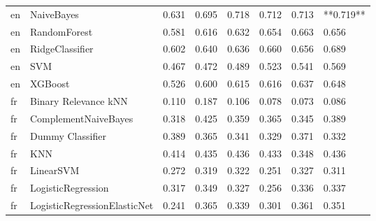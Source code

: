 \begin{tabular}{llllllll}
      en &                      NaiveBayes & 0.631 &                     0.695 &                 0.718 &                  0.712 &                                   0.713 & **0.719** \\
      en &                    RandomForest & 0.581 &                     0.616 &                 0.632 &                  0.654 &                                   0.663 &     0.656 \\
      en &                 RidgeClassifier & 0.602 &                     0.640 &                 0.636 &                  0.660 &                                   0.656 &     0.689 \\
      en &                             SVM & 0.467 &                     0.472 &                 0.489 &                  0.523 &                                   0.541 &     0.569 \\
      en &                         XGBoost & 0.526 &                     0.600 &                 0.615 &                  0.616 &                                   0.637 &     0.648 \\
      fr &            Binary Relevance kNN & 0.110 &                     0.187 &                 0.106 &                  0.078 &                                   0.073 &     0.086 \\
      fr &            ComplementNaiveBayes & 0.318 &                     0.425 &                 0.359 &                  0.365 &                                   0.345 &     0.389 \\
      fr &                Dummy Classifier & 0.389 &                     0.365 &                 0.341 &                  0.329 &                                   0.371 &     0.332 \\
      fr &                             KNN & 0.414 &                     0.435 &                 0.436 &                  0.433 &                                   0.348 &     0.436 \\
      fr &                       LinearSVM & 0.272 &                     0.319 &                 0.322 &                  0.251 &                                   0.327 &     0.311 \\
      fr &              LogisticRegression & 0.317 &                     0.349 &                 0.327 &                  0.256 &                                   0.336 &     0.337 \\
      fr &    LogisticRegressionElasticNet & 0.241 &                     0.365 &                 0.339 &                  0.301 &                                   0.361 &     0.351 \\

\end{tabular}
